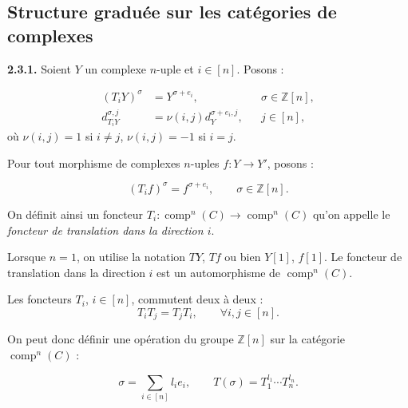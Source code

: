 %
\subsection{Structure graduée sur les catégories de complexes}

\noindent\textbf{2.3.1.}\quad
Soient $Y$ un complexe $n$-uple et $i\in[n]$. Posons :

\begin{equation}
  \begin{aligned}
    (T_iY)^\sigma&=Y^{\sigma+e_i},
      &&\sigma\in\mathbb Z[n],\\
    d_{T_iY}^{\sigma,j}&=\nu(i,j)d_Y^{\sigma+e_i,j},
      &&j\in[n],
  \end{aligned}
  \tag{2.3.1.1}
\end{equation}
où $\nu(i,j)=1$ si $i\ne j$, $\nu(i,j)=-1$ si $i=j$.

Pour tout morphisme de complexes $n$-uples
$f\colon Y\longrightarrow Y'$, posons :

\begin{equation}
  (T_if)^\sigma=f^{\sigma+e_i},
  \qquad \sigma\in\mathbb Z[n].
  \tag{2.3.1.2}
\end{equation}

On définit ainsi un foncteur
$T_i\colon\operatorname{comp}^{n}(C)\longrightarrow
\operatorname{comp}^{n}(C)$ qu'on appelle le
\emph{foncteur de translation dans la direction $i$}.

Lorsque $n=1$, on utilise la notation $TY$, $Tf$ ou bien $Y[1]$, $f[1]$.
Le foncteur de translation dans la direction $i$ est un automorphisme de
$\operatorname{comp}^{n}(C)$.

Les foncteurs $T_i$, $i\in[n]$, commutent deux à deux :
\begin{equation}
  T_iT_j=T_jT_i,
  \qquad \forall i,j\in[n].
  \tag{2.3.1.3}
\end{equation}

On peut donc définir une opération du groupe $\mathbb Z[n]$ sur la catégorie
$\operatorname{comp}^{n}(C)$ :

\begin{equation}
  \sigma=\sum_{i\in[n]}l_ie_i,
  \qquad
  T(\sigma)=T_1^{l_1}\cdots T_n^{l_n}.
  \tag{2.3.1.4}
\end{equation}


